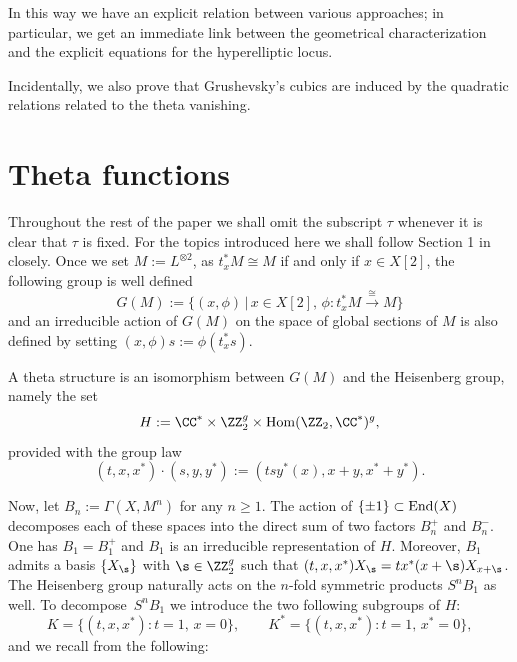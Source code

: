 In this way we have an explicit relation between various approaches; in particular, we get an immediate link between the geometrical characterization and the explicit equations for the hyperelliptic locus.

Incidentally, we also prove that Grushevsky's cubics are induced by the quadratic relations related to the theta vanishing.

\section{Theta functions}

Throughout the rest of the paper we shall omit the subscript $\tau$ whenever it is clear that $\tau$ is fixed.
For the topics introduced here we shall follow Section 1 in \cite{vG} closely. Once we set $ M:= L^{\otimes 2}$, as $t_{x}^*M\cong M$ if and only if $x \in X[2]$, the following group is well defined
\[
G(M):=\big\{(x, \phi) \,|\, x\in X[2], \, \phi\colon t_{x}^*M \xrightarrow{\cong} M \big\}
\]
and an irreducible action of $G(M)$ on the space of global sections of $M$ is also defined by setting $(x, \phi) s := \phi (t_{x}^*s)$.

A theta structure is an isomorphism between $G(M)$
and the Heisenberg group, namely the set
\[
H:=\CC^{*}\times\ZZ_{2}^g\times {\rm Hom}(\ZZ_{2}, \CC^{*})^g,
\]
provided with the group law
\[
(t,x,x^*) \cdot (s,y,y^*) :=(tsy^*(x), x+y, x^*+y^*).
\]

Now, let $B_n:=\Gamma(X, M^n)$ for any $n \geq 1$.
The action of $\{ \pm 1 \}\subset {\rm End}( X)$ decomposes each of these spaces into the direct sum of two factors $B_n ^{+}$ and $ B_n ^-$. One has $B_1= B_1^+$ and $B_1$ is an irreducible representation of $H$.
Moreover, $B_1$ admits a basis $\{X_{\s}\}$ with $\s\in\ZZ_2^g$ such that
$(t, x, x^*)X_{\s}=tx^*(x+\s)X_{x+\s}$. The Heisenberg group naturally acts on the $n$-fold symmetric products $S^nB_1$ as well. To decompose~$S^nB_1$ we introduce the two following subgroups of $H$:
\[
K=\{(t, x, x^*)\colon t=1,\, x=0\} , \qquad K^*=\{(t, x, x^*)\colon t=1,\, x^*=0\},
\]
and we recall from \cite{vG} the following:

